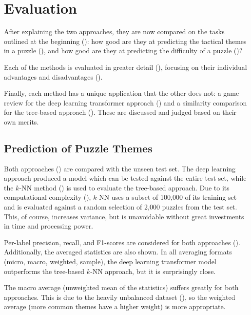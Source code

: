 \chapter{Evaluation}\label{evalChapter}

After explaining the two approaches, they are now compared on the tasks
outlined at the beginning (): how good are they at
predicting the tactical themes in a puzzle (), and how good are
they at predicting the difficulty of a puzzle ()?

Each of the methods is evaluated in greater detail (),
focusing on their individual advantages and disadvantages
().

Finally, each method has a unique application that the other does not: a game
review for the deep learning transformer approach () and a
similarity comparison for the tree-based approach (). These are
discussed and judged based on their own merits.


\section{Prediction of Puzzle Themes}\label{evalS1}

Both approaches () are compared with the unseen
test set. The deep learning approach produced a model which can be tested
against the entire test set, while the $k$-NN method () is used to
evaluate the tree-based approach. Due to its computational complexity
(), $k$-NN uses a subset of 100,000 of its training set and is
evaluated against a random selection of 2,000 puzzles from the test set. This,
of course, increases variance, but is unavoidable without great investments in
time and processing power.

Per-label precision, recall, and F1-scores are considered for both approaches
(). Additionally, the averaged statistics are also shown. In
all averaging formats (micro, macro, weighted, sample), the deep learning
transformer model outperforms the tree-based $k$-NN approach, but it is
surprisingly close. 

The macro average (unweighted mean of the statistics) suffers greatly for both
approaches. This is due to the heavily unbalanced dataset
(), so the weighted average (more common themes have a
higher weight) is more appropriate.

